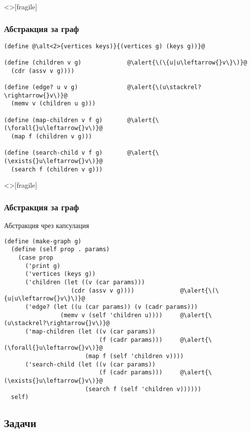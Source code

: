 \documentclass[alsotrans,beameroptions={aspectratio=169}]{beamerswitch}
\begin{document}
\begin{frame}<>[fragile]
  \frametitle{Абстракция за граф}

\begin{lstlisting}
(define @\alt<2>{vertices keys)}{(vertices g) (keys g))}@

(define (children v g)             @\alert{\(\{u|u\leftarrow{}v\}\)}@
  (cdr (assv v g))))

(define (edge? u v g)              @\alert{\(u\stackrel?\rightarrow{}v\)}@
  (memv v (children u g)))

(define (map-children v f g)       @\alert{\(\forall{}u\leftarrow{}v\)}@
  (map f (children v g)))

(define (search-child v f g)       @\alert{\(\exists{}u\leftarrow{}v\)}@
  (search f (children v g)))
\end{lstlisting}
\end{frame}

\begin{frame}<>[fragile]
  \frametitle{Абстракция за граф}

  \sizeboth\footnotesize
  Абстракция чрез капсулация
  \vspace{-.3ex}
\begin{lstlisting}
(define (make-graph g)
  (define (self prop . params)
    (case prop
      ('print g)
      ('vertices (keys g))
      ('children (let ((v (car params)))
                   (cdr (assv v g))))             @\alert{\(\{u|u\leftarrow{}v\}\)}@
      ('edge? (let ((u (car params)) (v (cadr params)))
                (memv v (self 'children u))))     @\alert{\(u\stackrel?\rightarrow{}v\)}@
      ('map-children (let ((v (car params))
                           (f (cadr params)))     @\alert{\(\forall{}u\leftarrow{}v\)}@
                       (map f (self 'children v))))
      ('search-child (let ((v (car params))
                           (f (cadr params)))     @\alert{\(\exists{}u\leftarrow{}v\)}@
                       (search f (self 'children v))))))
  self)
\end{lstlisting}
\end{frame}

\subsection{Задачи}
\end{document}
